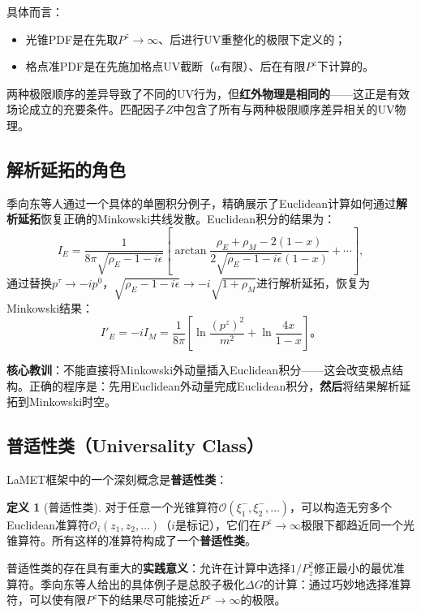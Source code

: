 \documentclass[12pt,a4paper]{ctexart}
\theoremstyle{definition}
\newtheorem{definition}{定义}[section]
\begin{document}
具体而言\cite{Ji2017More}：
\begin{itemize}
    \item 光锥PDF是在先取$P^z \to \infty$、后进行UV重整化的极限下定义的；
    \item 格点准PDF是在先施加格点UV截断（$a$有限）、后在有限$P^z$下计算的。
\end{itemize}
两种极限顺序的差异导致了不同的UV行为，但\textbf{红外物理是相同的}——这正是有效场论成立的充要条件。匹配因子$Z$中包含了所有与两种极限顺序差异相关的UV物理。

\subsection{解析延拓的角色}

季向东等人\cite{Ji2017More}通过一个具体的单圈积分例子，精确展示了Euclidean计算如何通过\textbf{解析延拓}恢复正确的Minkowski共线发散。Euclidean积分的结果为：
\begin{equation}
I_E = \frac{1}{8\pi\sqrt{\rho_E - 1 - i\epsilon}} \left[ \arctan\frac{\rho_E + \rho_M - 2(1-x)}{2\sqrt{\rho_E-1-i\epsilon}(1-x)} + \cdots \right],
\end{equation}
通过替换$p^\tau \to -ip^0$，$\sqrt{\rho_E-1-i\epsilon} \to -i\sqrt{1+\rho_M}$进行解析延拓，恢复为Minkowski结果：
\begin{equation}
I'_E = -i I_M = \frac{1}{8\pi} \left[ \ln\frac{(p^z)^2}{m^2} + \ln\frac{4x}{1-x} \right]。
\end{equation}

\textbf{核心教训}\cite{Ji2017More}：不能直接将Minkowski外动量插入Euclidean积分——这会改变极点结构。正确的程序是：先用Euclidean外动量完成Euclidean积分，\textbf{然后}将结果解析延拓到Minkowski时空。

\subsection{普适性类（Universality Class）}

LaMET框架中的一个深刻概念是\textbf{普适性类}\cite{Ji2014LaMET,Ji2017More}：

\begin{definition}[普适性类]
对于任意一个光锥算符$\mathcal{O}(\xi^-_1, \xi^-_2, \ldots)$，可以构造无穷多个Euclidean准算符$\mathcal{O}_i(z_1, z_2, \ldots)$（$i$是标记），它们在$P^z \to \infty$极限下都趋近同一个光锥算符。所有这样的准算符构成了一个\textbf{普适性类}。
\end{definition}

普适性类的存在具有重大的\textbf{实践意义}：允许在计算中选择$1/P_z^2$修正最小的最优准算符。季向东等人给出的具体例子是总胶子极化$\Delta G$的计算\cite{Ji2013gluon}：通过巧妙地选择准算符，可以使有限$P^z$下的结果尽可能接近$P^z \to \infty$的极限。
\end{document}
